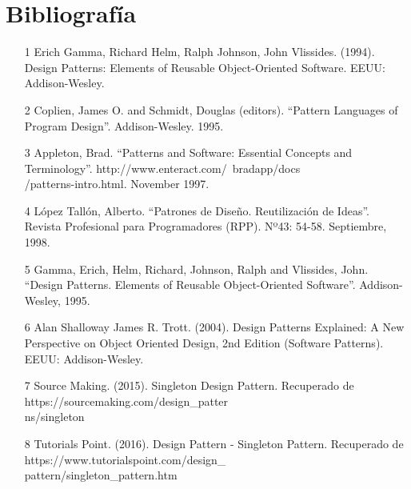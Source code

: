 \documentclass[twoside,twocolumn]{article}
\begin{document}
\section{Bibliografía}\label{sec:6}
\begin{itemize}
\item [1] Erich Gamma, Richard Helm, Ralph Johnson, John Vlissides. (1994). Design Patterns: Elements of Reusable Object-Oriented Software. EEUU: Addison-Wesley.
\item [2] Coplien, James O. and Schmidt, Douglas (editors). “Pattern Languages of Program Design”. Addison-Wesley. 1995.
\item [3] Appleton, Brad. “Patterns and Software: Essential Concepts and Terminology”. http://www.enteract.com/~bradapp/docs\\/patterns-intro.html. November 1997.
\item [4] López Tallón, Alberto. “Patrones de Diseño. Reutilización de Ideas”. Revista Profesional para Programadores (RPP). Nº43: 54-58. Septiembre, 1998.
\item [5] Gamma, Erich, Helm, Richard, Johnson, Ralph and Vlissides, John. “Design Patterns. Elements of Reusable Object-Oriented Software”. Addison-Wesley, 1995.
\item [6] Alan Shalloway James R. Trott. (2004). Design Patterns Explained: A New Perspective on Object Oriented Design, 2nd Edition (Software Patterns). EEUU: Addison-Wesley.
\item [7] Source Making. (2015). Singleton Design Pattern. Recuperado de https://sourcemaking.com/design\_patter\\ns/singleton
\item [8] Tutorials Point. (2016). Design Pattern - Singleton Pattern. Recuperado de https://www.tutorialspoint.com/design\_\\pattern/singleton\_pattern.htm
\end{itemize}



\end{document}
